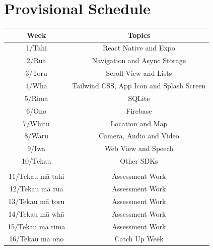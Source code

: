 \documentclass{article}
\begin{document}
\section*{Provisional Schedule}
\renewcommand{\arraystretch}{1.5}
\begin{tabular}{|c|c|c|}
	\hline
	\textbf{Week}                  & \multicolumn{2}{c|}{\textbf{Topics}}                                                                                             \\ \hline
	1/Tahi           & \multicolumn{2}{c|}{React Native and Expo}    \\ \hline
	2/Rua            & \multicolumn{2}{c|}{Navigation and Async Storage}                   \\ \hline
	3/Toru           & \multicolumn{2}{c|}{Scroll View and Lists} \\ \hline
	4/Whā            & \multicolumn{2}{c|}{Tailwind CSS, App Icon and Splash Screen}                               \\ \hline
	5/Rima           & \multicolumn{2}{c|}{SQLite}                                                \\ \hline
	6/Ono            & \multicolumn{2}{c|}{Firebase}                                                   \\ \hline
	7/Whitu          &  \multicolumn{2}{c|}{Location and Map}                            \\ \hline
	8/Waru           & \multicolumn{2}{c|}{Camera, Audio and Video}                                                   \\ \hline
	9/Iwa            & \multicolumn{2}{c|}{Web View and Speech}                                                                 \\ \hline
	10/Tekau         & \multicolumn{2}{c|}{Other SDKs}                                                                 \\ \hline
	\rowcolor{yellow} \multicolumn{3}{|c|}{Mid Semester Break}                                                                                                                         \\ \hline
	11/Tekau mā tahi & \multicolumn{2}{c|}{Assessment Work}                                                                 \\ \hline
	12/Tekau mā rua  & \multicolumn{2}{c|}{Assessment Work}                                                                 \\ \hline
	13/Tekau mā toru & \multicolumn{2}{c|}{Assessment Work}                                                     \\ \hline
	14/Tekau mā whā  & \multicolumn{2}{c|}{Assessment Work} \\ \hline 
	15/Tekau mā rima & \multicolumn{2}{c|}{Assessment Work}                                                       \\ \hline
	16/Tekau mā ono  & \multicolumn{2}{c|}{Catch Up Week}                                                         \\ \hline
\end{tabular}
\end{document}
